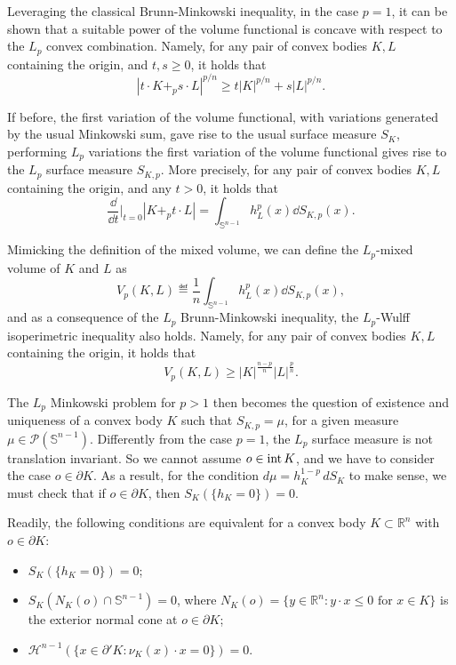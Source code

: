 \documentclass[a4paper, 10pt, twoside]{amsart}
\numberwithin{equation}{section}
\theoremstyle{plain}
\theoremstyle{definition}
\begin{document}
Leveraging the classical Brunn-Minkowski inequality, in the case $p = 1$, it can be shown that a suitable power of the volume functional is concave with respect to the $L_p$ convex combination. Namely, for any pair of convex bodies $K,L$ containing the origin, and $t,s\ge 0$, it holds that 
\begin{equation}\label{eq.LpBM}
    {|t\cdot K +_p s \cdot L|}^{p/n} \ge 
    t{|K|}^{p/n} + s{|L|}^{p/n}. 
\end{equation}

If before, the first variation of the volume functional, with variations generated by the usual Minkowski sum, gave rise to the usual surface measure $S_K$, performing $L_p$ variations the first variation of the volume functional gives rise to the $L_p$ surface measure $S_{K,p}$. More precisely, for any pair of convex bodies $K,L$ containing the origin, and any $t > 0$, it holds that
\begin{equation}\label{eq.first_variation_volume_Lp}
    \frac{\dd}{\dd t} \Big|_{t=0} |K +_p t\cdot L| 
    =
    \int_{\mathbb{S}^{n-1}} h_L^p(x) \dd S_{K,p}(x).
\end{equation}

Mimicking the definition of the mixed volume, we can define the $L_p$-mixed volume of $K$ and $L$ as
\begin{equation}
    V_p(K,L)
    \eqdef
    \frac{1}{n} \int_{\mathbb{S}^{n-1}} h_L^p(x) \dd S_{K,p}(x),
\end{equation}
and as a consequence of the $L_p$ Brunn-Minkowski inequality, the $L_p$-Wulff isoperimetric inequality also holds. Namely, for any pair of convex bodies $K,L$ containing the origin, it holds that
\begin{equation}\label{eq.LpWulff}
    V_p(K,L) \ge {|K|}^{\frac{n-p}{n}}{|L|}^{\frac{p}{n}}.
\end{equation}

The $L_p$ Minkowski problem for $p>1$ then becomes the question of existence and uniqueness of a convex body $K$ such that $S_{K,p} = \mu$, for a given measure $\mu \in \mathscr{P}(\mathbb{S}^{n-1})$. Differently from the case $p=1$, the $L_p$ surface measure is not translation invariant. So we cannot assume $o\in{\rm int}\, K$, and we have to consider the case $o\in\partial K$. As a result, for the condition $d\mu=h_K^{1-p}\,dS_K$ to make sense, we must check that if $o\in \partial K$, then $S_K(\{h_K=0\})=0$. 

Readily, the following conditions are equivalent for a convex body $K\subset \mathbb{R}^n$ with $o\in\partial K$:
\begin{itemize}
\item $S_K(\{h_K=0\})=0$;
\item $S_K(N_K(o)\cap \mathbb{S}^{n-1})=0$, where $N_K(o)=\{y\in\mathbb{R}^n:y\cdot x\leq 0\mbox{ for }x\in K\}$ is the exterior normal cone at $o\in\partial K$;
\item $\mathcal{H}^{n-1}(\{x\in \partial' K:\nu_K(x)\cdot x=0\})=0$.
\end{itemize}
\end{document}
